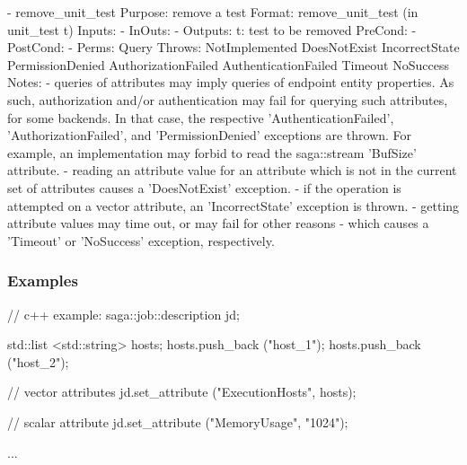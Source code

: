 \begin{myspec}
 
    - remove_unit_test
      Purpose:  remove a test
      Format:   remove_unit_test        (in unit_test t)
      Inputs:   -
      InOuts:   -
      Outputs:  t:                    test to be removed
      PreCond:  -
      PostCond: -
      Perms:    Query
      Throws:   NotImplemented
                DoesNotExist
                IncorrectState
                PermissionDenied
                AuthorizationFailed
                AuthenticationFailed
                Timeout
                NoSuccess
      Notes:    - queries of attributes may imply queries of
                  endpoint entity properties.  As such,
                  authorization and/or authentication may fail
                  for querying such attributes, for some
                  backends.  In that case, the respective
                  'AuthenticationFailed', 'AuthorizationFailed',
                  and 'PermissionDenied' exceptions are thrown.
                  For example, an implementation may forbid to
                  read the saga::stream 'BufSize' attribute.
                - reading an attribute value for an attribute
                  which is not in the current set of attributes
                  causes a 'DoesNotExist' exception.
                - if the operation is attempted on a vector
                  attribute, an 'IncorrectState' exception is
                  thrown.
                - getting attribute values may time out, or may 
                  fail for other reasons - which causes a 
                  'Timeout' or 'NoSuccess' exception, 
                  respectively.
 \end{myspec}
 
 
 \subsubsection{Examples}
 
 \begin{mycode}
  // c++ example:
  saga::job::description jd;
 
  std::list <std::string> hosts;
  hosts.push_back ("host_1");
  hosts.push_back ("host_2");
 
  // vector attributes
  jd.set_attribute ("ExecutionHosts", hosts);
 
  // scalar attribute
  jd.set_attribute ("MemoryUsage", "1024");
 
  ...
 \end{mycode}
 
